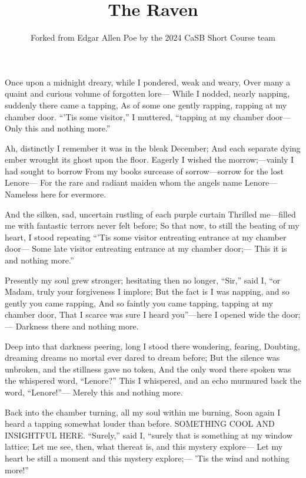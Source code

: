 \documentclass{article}
\title{The Raven}
\author{Forked from Edgar Allen Poe by the 2024 CaSB Short Course team}
\begin{document}
\maketitle

Once upon a midnight dreary, while I pondered, weak and weary,
Over many a quaint and curious volume of forgotten lore—
    While I nodded, nearly napping, suddenly there came a tapping,
As of some one gently rapping, rapping at my chamber door.
``'Tis some visitor,” I muttered, “tapping at my chamber door—
            Only this and nothing more.”

    Ah, distinctly I remember it was in the bleak December;
And each separate dying ember wrought its ghost upon the floor.
    Eagerly I wished the morrow;—vainly I had sought to borrow
    From my books surcease of sorrow—sorrow for the lost Lenore—
For the rare and radiant maiden whom the angels name Lenore—
            Nameless here for evermore.

    And the silken, sad, uncertain rustling of each purple curtain
Thrilled me—filled me with fantastic terrors never felt before;
    So that now, to still the beating of my heart, I stood repeating
    ``'Tis some visitor entreating entrance at my chamber door—
Some late visitor entreating entrance at my chamber door;—
            This it is and nothing more.”

    Presently my soul grew stronger; hesitating then no longer,
    ``Sir,” said I, ``or Madam, truly your forgiveness I implore;
    But the fact is I was napping, and so gently you came rapping,
    And so faintly you came tapping, tapping at my chamber door,
That I scarce was sure I heard you”—here I opened wide the door;—
            Darkness there and nothing more.

    Deep into that darkness peering, long I stood there wondering, fearing,
Doubting, dreaming dreams no mortal ever dared to dream before;
    But the silence was unbroken, and the stillness gave no token,
    And the only word there spoken was the whispered word, “Lenore?”
This I whispered, and an echo murmured back the word, ``Lenore!”—
            Merely this and nothing more.

    Back into the chamber turning, all my soul within me burning,
Soon again I heard a tapping somewhat louder than before. SOMETHING COOL AND INSIGHTFUL HERE.
``Surely,” said I, “surely that is something at my window lattice;
      Let me see, then, what thereat is, and this mystery explore—
Let my heart be still a moment and this mystery explore;—
'Tis the wind and nothing more!”
\end{document}
